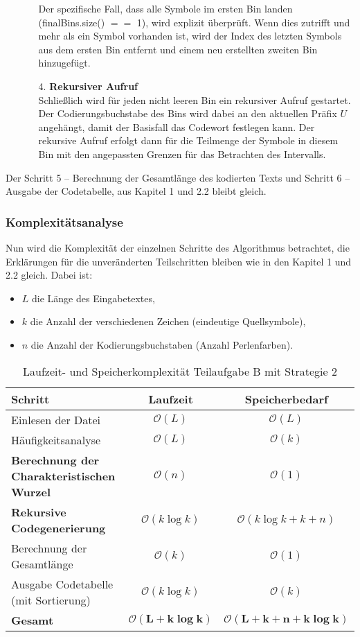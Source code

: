 \documentclass[a4paper,10pt,ngerman]{scrartcl}
\begin{document}
\begin{enumerate}
\begin{enumerate}
    Der spezifische Fall, dass alle Symbole im ersten Bin landen (finalBins.size() $==$ 1), wird explizit überprüft. Wenn dies zutrifft und mehr als ein Symbol vorhanden ist, wird der Index des letzten Symbols aus dem ersten Bin entfernt und einem neu erstellten zweiten Bin hinzugefügt. 
    \item [4.] \textbf{Rekursiver Aufruf}\\
    Schließlich wird für jeden nicht leeren Bin ein rekursiver Aufruf gestartet. Der Codierungsbuchstabe des Bins wird dabei an den aktuellen Präfix $U$ angehängt, damit der Basisfall das Codewort festlegen kann. Der rekursive Aufruf erfolgt dann für die Teilmenge der Symbole in diesem Bin mit den angepassten Grenzen für das Betrachten des Intervalls. 
  \end{enumerate}
\end{enumerate}

Der Schritt 5 – Berechnung der Gesamtlänge des kodierten Texts und Schritt 6 – Ausgabe der Codetabelle, aus Kapitel 1 und 2.2 bleibt gleich. 

\subsubsection{Komplexitätsanalyse}
Nun wird die Komplexität der einzelnen Schritte des Algorithmus betrachtet, die Erklärungen für die unveränderten Teilschritten bleiben wie in den Kapitel 1 und 2.2 gleich. Dabei ist:
\begin{itemize}
  \item $L$ die Länge des Eingabetextes,
  \item $k$ die Anzahl der verschiedenen Zeichen (eindeutige Quellsymbole),
  \item $n$ die Anzahl der Kodierungsbuchstaben (Anzahl Perlenfarben).
\end{itemize}
\vspace{0.2cm}

\begin{table}[H]
\centering
\begin{tabular}{|l|c|c|}
\hline
\textbf{Schritt} & \textbf{Laufzeit} & \textbf{Speicherbedarf} \\
\hline
Einlesen der Datei & $\mathcal{O}(L)$ & $\mathcal{O}(L)$ \\
Häufigkeitsanalyse & $\mathcal{O}(L)$ & $\mathcal{O}(k)$ \\
\textbf{Berechnung der Charakteristischen Wurzel} & $\mathcal{O}(n)$ & $\mathcal{O}(1)$ \\
\textbf{Rekursive Codegenerierung} & $\mathcal{O}(k \log k)$ & $\mathcal{O}(k \log k + k + n)$ \\
Berechnung der Gesamtlänge & $\mathcal{O}(k)$ & $\mathcal{O}(1)$ \\
Ausgabe Codetabelle (mit Sortierung) & $\mathcal{O}(k \log k)$ & $\mathcal{O}(k)$ \\
\hline
\textbf{Gesamt} & $\boldsymbol{\mathcal{O}(L + k \log k)}$ & $\boldsymbol{\mathcal{O}(L + k + n + k \log k)}$ \\
\hline
\end{tabular}
\caption{Laufzeit- und Speicherkomplexität Teilaufgabe B mit Strategie 2}
\end{table}
\end{document}
